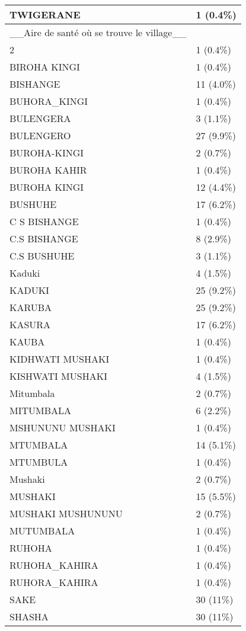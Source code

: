 \documentclass[
]{book}
\begin{document}
\begin{tabular}{l|l}
\hline
TWIGERANE & 1 (0.4\%)\\
\hline
\_\_Aire de santé où se trouve le village\_\_ & \\
\hline
2 & 1 (0.4\%)\\
\hline
BIROHA KINGI & 1 (0.4\%)\\
\hline
BISHANGE & 11 (4.0\%)\\
\hline
BUHORA\_KINGI & 1 (0.4\%)\\
\hline
BULENGERA & 3 (1.1\%)\\
\hline
BULENGERO & 27 (9.9\%)\\
\hline
BUROHA-KINGI & 2 (0.7\%)\\
\hline
BUROHA KAHIR & 1 (0.4\%)\\
\hline
BUROHA KINGI & 12 (4.4\%)\\
\hline
BUSHUHE & 17 (6.2\%)\\
\hline
C S BISHANGE & 1 (0.4\%)\\
\hline
C.S BISHANGE & 8 (2.9\%)\\
\hline
C.S BUSHUHE & 3 (1.1\%)\\
\hline
Kaduki & 4 (1.5\%)\\
\hline
KADUKI & 25 (9.2\%)\\
\hline
KARUBA & 25 (9.2\%)\\
\hline
KASURA & 17 (6.2\%)\\
\hline
KAUBA & 1 (0.4\%)\\
\hline
KIDHWATI MUSHAKI & 1 (0.4\%)\\
\hline
KISHWATI MUSHAKI & 4 (1.5\%)\\
\hline
Mitumbala & 2 (0.7\%)\\
\hline
MITUMBALA & 6 (2.2\%)\\
\hline
MSHUNUNU MUSHAKI & 1 (0.4\%)\\
\hline
MTUMBALA & 14 (5.1\%)\\
\hline
MTUMBULA & 1 (0.4\%)\\
\hline
Mushaki & 2 (0.7\%)\\
\hline
MUSHAKI & 15 (5.5\%)\\
\hline
MUSHAKI MUSHUNUNU & 2 (0.7\%)\\
\hline
MUTUMBALA & 1 (0.4\%)\\
\hline
RUHOHA & 1 (0.4\%)\\
\hline
RUHOHA\_KAHIRA & 1 (0.4\%)\\
\hline
RUHORA\_KAHIRA & 1 (0.4\%)\\
\hline
SAKE & 30 (11\%)\\
\hline
SHASHA & 30 (11\%)\\

\end{tabular}
\end{document}
